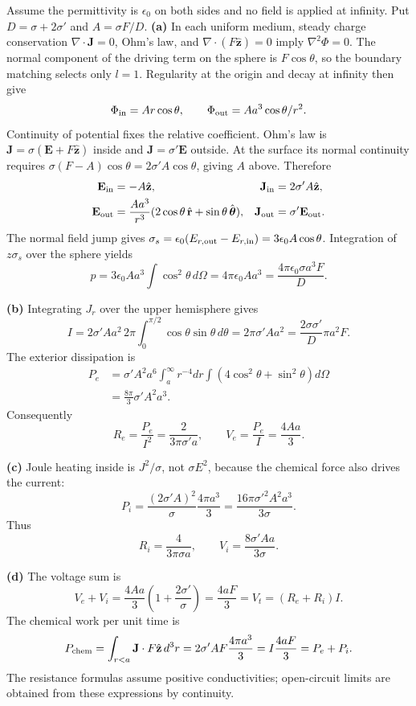 Assume the permittivity is $\epsilon_0$ on both sides and no field is
applied at infinity.  Put $D=\sigma+2\sigma'$ and $A=\sigma F/D$.
\textbf{(a)} In each uniform medium, steady charge conservation
$\nabla\cdot\mathbf J=0$, Ohm's law, and
$\nabla\cdot(F\hat{\mathbf z})=0$ imply $\nabla^2\Phi=0$.
The normal component of the driving term on the sphere is
$F\cos\theta$, so the boundary matching selects only $l=1$.
Regularity at the origin and decay at infinity then give
\[
\Phi_{\rm in}=Ar\cos\theta,\qquad
\Phi_{\rm out}=Aa^3\cos\theta/r^2.
\]
Continuity of potential fixes the relative coefficient.  Ohm's law
is $\mathbf J=\sigma(\mathbf E+F\hat{\mathbf z})$ inside and
$\mathbf J=\sigma'\mathbf E$ outside.  At the surface its normal
continuity requires
$\sigma(F-A)\cos\theta=2\sigma'A\cos\theta$, giving $A$ above.
Therefore
\begin{align*}
\mathbf E_{\rm in}&=-A\hat{\mathbf z},&
\mathbf J_{\rm in}&=2\sigma'A\hat{\mathbf z},\\
\mathbf E_{\rm out}&=\frac{Aa^3}{r^3}
(2\cos\theta\,\hat{\mathbf r}+\sin\theta\,\hat{\boldsymbol\theta}),&
\mathbf J_{\rm out}&=\sigma'\mathbf E_{\rm out}.
\end{align*}
The normal field jump gives
$\sigma_s=\epsilon_0(E_{r,\rm out}-E_{r,\rm in})=3\epsilon_0A\cos\theta$.
Integration of $z\sigma_s$ over the sphere yields
\[
p=3\epsilon_0Aa^3\int\cos^2\theta\,d\Omega
=4\pi\epsilon_0Aa^3=\frac{4\pi\epsilon_0\sigma a^3F}{D}.
\]

\textbf{(b)} Integrating $J_r$ over the upper hemisphere gives
\[
I=2\sigma'Aa^2\,2\pi\int_0^{\pi/2}\cos\theta\sin\theta\,d\theta
=2\pi\sigma'Aa^2=\frac{2\sigma\sigma'}D\pi a^2F.
\]
The exterior dissipation is
\begin{align*}
P_e&=\sigma'A^2a^6\int_a^\infty r^{-4}dr
\int(4\cos^2\theta+\sin^2\theta)d\Omega\\
&=\frac{8\pi}{3}\sigma'A^2a^3.
\end{align*}
Consequently
\[
\boxed{R_e=\frac{P_e}{I^2}=\frac{2}{3\pi\sigma'a},\qquad
V_e=\frac{P_e}{I}=\frac{4Aa}{3}.}
\]

\textbf{(c)} Joule heating inside is $J^2/\sigma$, not
$\sigma E^2$, because the chemical force also drives the current:
\[
P_i=\frac{(2\sigma'A)^2}{\sigma}\frac{4\pi a^3}{3}
=\frac{16\pi\sigma'^2A^2a^3}{3\sigma}.
\]
Thus
\[
\boxed{R_i=\frac{4}{3\pi\sigma a},\qquad
V_i=\frac{8\sigma'Aa}{3\sigma}.}
\]

\textbf{(d)} The voltage sum is
\[
V_e+V_i=\frac{4Aa}{3}\left(1+\frac{2\sigma'}\sigma\right)
=\frac{4aF}{3}=V_t=(R_e+R_i)I.
\]
The chemical work per unit time is
\[
P_{\rm chem}=\int_{r<a}\mathbf J\cdot F\hat{\mathbf z}\,d^3r
=2\sigma'AF\frac{4\pi a^3}{3}
=I\frac{4aF}{3}=P_e+P_i.
\]
The resistance formulas assume positive conductivities; open-circuit
limits are obtained from these expressions by continuity.

